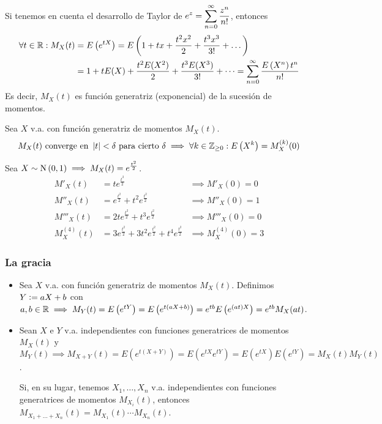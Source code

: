 Si tenemos en cuenta el desarrollo de Taylor de $\displaystyle e^{z} = \sum_{n=0}^{\infty} \frac{z^n}{n!}$, entonces
\[\begin{aligned}
		\forall t\in \mathbb{R} : M_X(t) & = E\left(e^{tX}\right) = E\left(1 + tx + \frac{t^2x^2}{2} + \frac{t^3x^3}{3!} + \dots\right)                           \\
		                         & = 1 + tE(X) + \frac{t^2E(X^2)}{2} + \frac{t^3E(X^3)}{3!} + \dots = \sum_{n=0}^{\infty} \frac{E\left(X^n\right)t^n}{n!}
	\end{aligned}\]
Es decir, $M_X(t)$ es función generatriz (exponencial) de la sucesión de momentos.

\begin{teo}
	Sea $X$ v.a. con función generatriz de momentos $M_X(t)$.
	\[M_X(t) \text{ converge en }\left|t\right|< \delta \text{ para cierto }\delta \implies \forall k \in \mathbb{Z}_{\geq 0} : E\left(X^k\right) = M^{(k)}_X (0)\]
\end{teo}

\begin{ejem}
	Sea $X\sim\operatorname{N}\left(0,1\right) \implies M_X(t) = e^{\frac{t^2}{2}}$.
	\[\begin{aligned}
			M'_X(t)      & = te^{\frac{t^2}{2}}                                                & \implies M'_X(0) = 0      \\
			M''_X(t)     & = e^{\frac{t^2}{2}} + t^2e^{\frac{t^2}{2}}                          & \implies M''_X(0) = 1     \\
			M'''_X(t)    & = 2te^{\frac{t^2}{2}} + t^3e^{\frac{t^2}{2}}                        & \implies M'''_X(0) = 0    \\
			M^{(4)}_X(t) & = 3e^{\frac{t^2}{2}} + 3t^2e^{\frac{t^2}{2}} + t^4e^{\frac{t^2}{2}} & \implies M^{(4)}_X(0) = 3
		\end{aligned}\]
\end{ejem}

\subsubsection{La gracia}

\begin{itemize}
	\item Sea $X$ v.a. con función generatriz de momentos $M_X(t)$. Definimos $Y\vcentcolon= aX+b$ con $a,b\in \mathbb{R} \implies M_Y(t) = E\left(e^{tY}\right) = E\left(e^{t(aX+b)}\right) = e^{tb}E\left(e^{(at)X}\right) = e^{tb}M_X(at)$.

	\item Sean $X$ e $Y$ v.a. independientes con funciones generatrices de momentos $M_X(t)$ y $M_Y(t) \implies M_{X+Y}(t) = E\left(e^{t(X+Y)}\right) = E\left(e^{tX}e^{tY}\right) = E\left(e^{tX}\right)E\left(e^{tY}\right) = M_X(t)M_Y(t)$.

	      Si, en su lugar, tenemos $X_1, \dots, X_n$ v.a. independientes con funciones generatrices de momentos $M_{X_i}(t)$, entonces $M_{X_1 + \dots + X_n}(t) = M_{X_1}(t) \cdots M_{X_n}(t)$.
\end{itemize}

